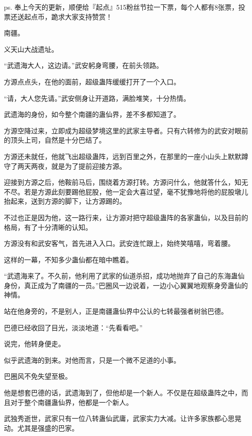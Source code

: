 
\begin{this_body}

ps. 奉上今天的更新，顺便给『起点』515粉丝节拉一下票，每个人都有8张票，投票还送起点币，跪求大家支持赞赏！

南疆。

义天山大战遗址。

“武遗海大人，这边请。”武安躬身弯腰，在前头领路。

方源点点头，在他的面前，超级蛊阵缓缓打开了一个入口。

“请，大人您先请。”武安侧身让开道路，满脸堆笑，十分热情。

武遗海的身份，如今整个南疆的蛊仙界，差不多都知道了。

方源空降过来，立即成为超级梦境这里的武家主导者。只有六转修为的武安对眼前的顶头上司，自然是十分巴结了。

方源还未就任，他就飞出超级蛊阵，远到百里之外，在那里的一座小山头上默默蹲守了两天两夜，就是为了提前迎接方源。

迎接到方源之后，他鞍前马后，围绕着方源打转。方源问什么，他就答什么，知无不尽。若是方源此刻要踢他屁股，他一定会大喜过望，毫不犹豫地将他的屁股墩儿抬起来，送到方源的脚下，让方源踢的。

不过也正是因为他，这一路行来，让方源对把守超级蛊阵的各家蛊仙，以及目前的格局，有了十分清晰的认知。

方源没有和武安客气，首先进入入口。武安连忙跟上，始终笑嘻嘻，弯着腰。

这样的一幕，不知多少蛊仙都在暗中瞧着。

“武遗海来了。不久前，他利用了武家的仙道杀招，成功地抛弃了自己的东海蛊仙身份，真正成为了南疆的一员。”巴圈风一边说着，一边小心翼翼地观察身旁蛊仙的神情。

站在他身旁的，不是别人，正是南疆蛊仙界中公认的七转最强者树翁巴德。

巴德已经收回了目光，淡淡地道：“先看看吧。”

说完，他转身便走。

似乎武遗海的到来。对他而言，只是一个微不足道的小事。

巴圈风不免失望至极。

他是想套巴德的话，武遗海到了，但他却是一个新人。不仅是在超级蛊阵之中，而且对于整个南疆蛊仙界，他都是一个新人。

武独秀逝世，武家只有一位八转蛊仙武庸，武家实力大减。让许多家族都心思晃动。尤其是强盛的巴家。


\end{this_body}
